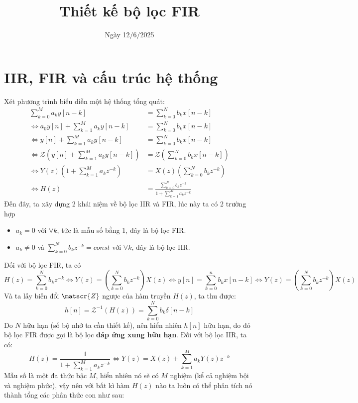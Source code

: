 \documentclass{article}
\title{Thiết kế bộ lọc FIR
}
\author{}
\date{Ngày 12/6/2025}
\begin{document}
\maketitle
  \section{IIR, FIR và cấu trúc hệ thống}
Xét phương trình biểu diễn một hệ thống tổng quát:
\begin{equation*}
	\begin{split}
		\sum_{k=0}^{M}a_{k}y[n-k]&=\sum_{k=0}^{N}b_{k}x[n-k] \\
		\Leftrightarrow a_{0}y[n]+\sum_{k=1}^{M}a_{k}y[n-k]&=\sum_{k=0}^{N}b_{k}x[n-k]\\
    \Leftrightarrow y[n]+\sum_{k=1}^{M}a_{k}y[n-k]&=\sum_{k=0}^{N}b_{k}x[n-k]\\
    \Leftrightarrow \mathscr{Z}(y[n]+\sum_{k=1}^{M}a_{k}y[n-k])&=\mathscr{Z}(\sum_{k=0}^{N}b_{k}x[n-k])\\
    \Leftrightarrow Y(z)\left(1+\sum_{k=1}^{M}a_{k}z^{-k}\right)&=X(z)\left(\sum_{k=0}^{N}b_{k}z^{-k}\right)\\
    \Leftrightarrow H(z)&=\frac{\sum_{k=0}^{N}b_{k}z^{-k}}{1+\sum_{k=1}^{M}a_{k}z^{-k}}
	\end{split}
\end{equation*}
Đến đây, ta xây dựng 2 khái niệm về bộ lọc IIR và FIR, lúc này ta có 2 trường hợp
\begin{itemize}
  \item $a_{k}=0$ với $\forall k$, tức là mẫu số bằng $1$, đây là bộ lọc FIR.
  \item $a_{k}\neq 0$ và $\sum_{k=0}^{N}b_{k}z^{-k}=const$ với $\forall k$, đây là bộ lọc IIR.
\end{itemize}
Đối với bộ lọc FIR, ta có
$$H(z)=\sum_{k=0}^{N}b_{k}z^{-k}\Leftrightarrow Y(z)=\left(\sum_{k=0}^{N}b_{k}z^{-k}\right)X(z)\Leftrightarrow y[n]=\sum_{k=0}^{n}b_{k}x[n-k]\Leftrightarrow Y(z)=\left(\sum_{k=0}^{N}b_{k}z^{-k}\right)X(z)$$
Và ta lấy biến đổi $\matscr{Z}$ ngược của hàm truyền $H(z)$, ta thu được:
$$h[n]=\mathscr{Z}^{-1}(H(z))=\sum_{k=0}^{N}b_{k}\delta{[n-k]}$$
Do $N$ hữu hạn (số bộ nhớ ta cần thiết kế), nên hiển nhiên $h[n]$ hữu hạn, do đó bộ lọc FIR được gọi là bộ lọc \textbf{đáp ứng xung hữu hạn}.
Đối với bộ lọc IIR, ta có:
$$H(z)=\frac{1}{1+\sum_{k=1}^{M}a_{k}z^{-k}}\Leftrightarrow Y(z)=X(z)+\sum_{k=1}^{M}a_{k}Y(z)z^{-k}$$
Mẫu số là một đa thức bậc $M$, hiển nhiên nó sẽ có $M$ nghiệm (kể cả nghiệm bội và nghiệm phức), vậy nên với bất kì hàm $H(z)$ nào ta luôn có thể phân tích nó thành tổng các phân thức con như sau:
\end{document}

